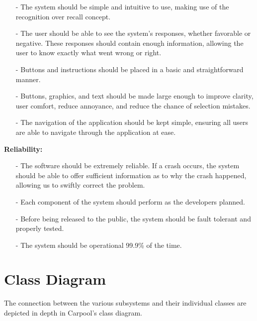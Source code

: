 \documentclass[hidelinks, 12pt, a4paper]{article}
\begin{document}
            \begin{itemize}
             \item[-] The system should be simple and intuitive to use, making use of the recognition over recall concept. 
             \item[-]The user should be able to see the system's responses, whether favorable or negative. These responses should contain enough information, allowing the user to know exactly what went wrong or right.
            \item[-] Buttons and instructions should be placed in a basic and straightforward manner.
            \item[-]Buttons, graphics, and text should be made large enough to improve clarity, user comfort, reduce annoyance, and reduce the chance of selection mistakes.
            \item[-]The navigation of the application should be kept simple, ensuring all users are able to navigate through the application at ease.
            
             \end{itemize}
 \vspace{0.5cm}            
        \large{ \textbf{Reliability:}}
            \begin{itemize}
             \item[-] The software should be extremely reliable. If a crash occurs, the system should be able to offer sufficient information as to why the crash happened, allowing us to swiftly correct the problem.
             \item[-] Each component of the system should perform as the developers planned.
             \item[-] Before being released to the public, the system should be fault tolerant and properly tested.
             \item[-] 	The system should be operational 99.9\% of the time.

             \end{itemize}


\newpage
\section{Class Diagram}
The connection between the various subsystems and their individual classes are depicted in depth in Carpool’s class diagram.
\vspace{1.5cm}
    
\end{document}
